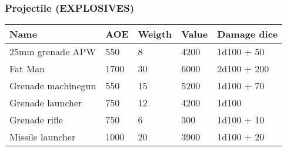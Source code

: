 
\subsubsection{Projectile (EXPLOSIVES)}
\begin{longtable}{|p{4cm}|p{1.5cm}|p{1.5cm}|p{2cm}|p{4cm}|}
\hline
\bfseries Name & \bfseries AOE & \bfseries Weigth & \bfseries Value & \bfseries Damage dice \\
\hline
\endhead
25mm grenade APW  & 550 & 8 & 4200 & 1d100 + 50 \\
Fat Man & 1700 & 30 & 6000 & 2d100 + 200 \\
Grenade machinegun  & 550 & 15 & 5200 & 1d100 + 70 \\
Grenade launcher  & 750 & 12 & 4200 & 1d100 \\
Grenade rifle  & 750 & 6 & 300 & 1d100 + 10 \\
Missile launcher  & 1000 & 20 & 3900 & 1d100  + 20 \\
\hline
\end{longtable}
